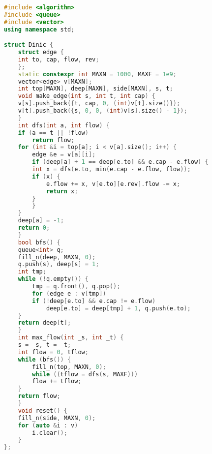 \begin{lstlisting}[language=C++, caption={Dinic algorithm}]
#include <algorithm>
#include <queue>
#include <vector>
using namespace std;

struct Dinic {
    struct edge {
    int to, cap, flow, rev;
    };
    static constexpr int MAXN = 1000, MAXF = 1e9;
    vector<edge> v[MAXN];
    int top[MAXN], deep[MAXN], side[MAXN], s, t;
    void make_edge(int s, int t, int cap) {
    v[s].push_back({t, cap, 0, (int)v[t].size()});
    v[t].push_back({s, 0, 0, (int)v[s].size() - 1});
    }
    int dfs(int a, int flow) {
    if (a == t || !flow)
        return flow;
    for (int &i = top[a]; i < v[a].size(); i++) {
        edge &e = v[a][i];
        if (deep[a] + 1 == deep[e.to] && e.cap - e.flow) {
        int x = dfs(e.to, min(e.cap - e.flow, flow));
        if (x) {
            e.flow += x, v[e.to][e.rev].flow -= x;
            return x;
        }
        }
    }
    deep[a] = -1;
    return 0;
    }
    bool bfs() {
    queue<int> q;
    fill_n(deep, MAXN, 0);
    q.push(s), deep[s] = 1;
    int tmp;
    while (!q.empty()) {
        tmp = q.front(), q.pop();
        for (edge e : v[tmp])
        if (!deep[e.to] && e.cap != e.flow)
            deep[e.to] = deep[tmp] + 1, q.push(e.to);
    }
    return deep[t];
    }
    int max_flow(int _s, int _t) {
    s = _s, t = _t;
    int flow = 0, tflow;
    while (bfs()) {
        fill_n(top, MAXN, 0);
        while ((tflow = dfs(s, MAXF)))
        flow += tflow;
    }
    return flow;
    }
    void reset() {
    fill_n(side, MAXN, 0);
    for (auto &i : v)
        i.clear();
    }
};
    \end{lstlisting}